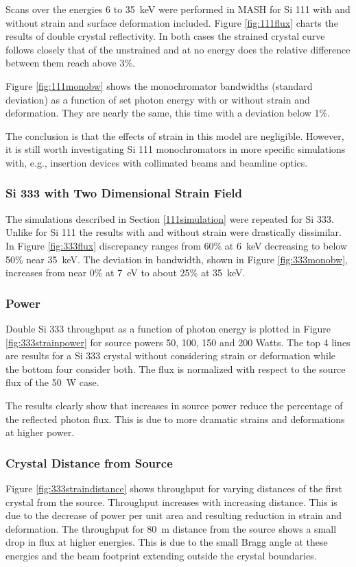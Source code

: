 \documentclass[preprint]{iucr}              %
\begin{document}
Scans over the energies 6 to 35~keV were performed in MASH for Si 111 with and without strain and surface deformation included. Figure \ref{fig:111flux} charts the results of double crystal reflectivity. In both cases the strained crystal curve follows closely that of the unstrained and at no energy does the relative difference between them reach above 3\%.

Figure \ref{fig:111monobw} shows the monochromator bandwidths (standard deviation) as a function of set photon energy with or without strain and deformation. They are nearly the same, this time with a deviation below 1\%.

The conclusion is that the effects of strain in this model are negligible. However, it is still worth investigating Si 111 monochromators in more specific simulations with, e.g., insertion devices with collimated beams and beamline optics.



\subsubsection{Si 333 with Two Dimensional Strain Field}\label{parameterscans}

The simulations described in Section \ref{111simulation} were repeated for Si 333. Unlike for Si 111 the results with and without strain were drastically dissimilar. In Figure \ref{fig:333flux} discrepancy ranges from 60\% at 6~keV decreasing to below 50\% near 35~keV. The deviation in bandwidth, shown in Figure \ref{fig:333monobw}, increases from near 0\% at 7~eV to about 25\% at 35~keV.


\subsubsection{Power}
Double Si 333 throughput as a function of photon energy is plotted in Figure \ref{fig:333strainpower} for source powers 50, 100, 150 and 200 Watts. The top 4 lines are results for a Si 333 crystal without considering strain or deformation while the bottom four consider both. The flux is normalized with respect to the source flux of the 50~W case.

The results clearly show that increases in source power reduce the percentage of the reflected photon flux. This is due to more dramatic strains and deformations at higher power.

\subsubsection{Crystal Distance from Source}
Figure \ref{fig:333straindistance} shows throughput for varying distances of the first crystal from the source. Throughput increases with increasing distance. This is due to the decrease of power per unit area and resulting reduction in strain and deformation. The throughput for 80~m distance from the source shows a small drop in flux at higher energies. This is due to the small Bragg angle at these energies and the beam footprint extending outside the crystal boundaries.
\end{document}
